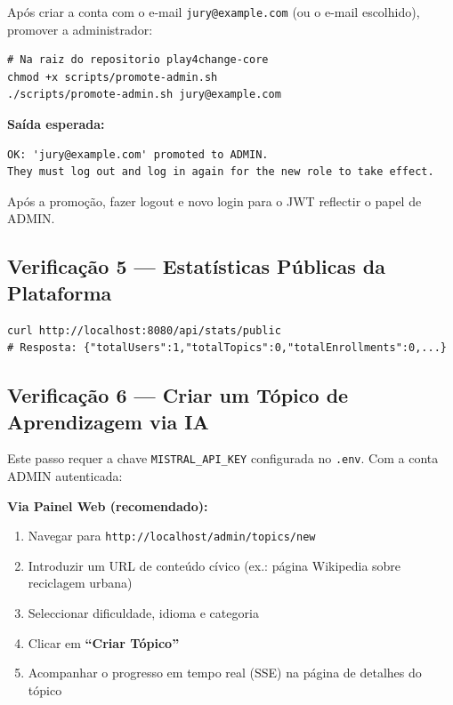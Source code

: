 \documentclass[12pt,a4paper]{article}
\newcommand{\file}[1]{\texttt{\small\color{darkgray}#1}}
\newcommand{\env}[1]{\texttt{\small\color{iselred}#1}}
\begin{document}
Após criar a conta com o e-mail \texttt{jury@example.com} (ou o e-mail escolhido), promover a administrador:

\begin{lstlisting}[style=bash]
# Na raiz do repositorio play4change-core
chmod +x scripts/promote-admin.sh
./scripts/promote-admin.sh jury@example.com
\end{lstlisting}

\textbf{Saída esperada:}
\begin{lstlisting}
OK: 'jury@example.com' promoted to ADMIN.
They must log out and log in again for the new role to take effect.
\end{lstlisting}

Após a promoção, fazer logout e novo login para o JWT reflectir o papel de ADMIN.

\subsection{Verificação 5 — Estatísticas Públicas da Plataforma}

\begin{lstlisting}[style=bash]
curl http://localhost:8080/api/stats/public
# Resposta: {"totalUsers":1,"totalTopics":0,"totalEnrollments":0,...}
\end{lstlisting}

\subsection{Verificação 6 — Criar um Tópico de Aprendizagem via IA}

Este passo requer a chave \env{MISTRAL\_API\_KEY} configurada no \file{.env}. Com a conta ADMIN autenticada:

\begin{mdframed}[style=infobox]
\textbf{Via Painel Web (recomendado):}
\begin{enumerate}
  \item Navegar para \texttt{http://localhost/admin/topics/new}
  \item Introduzir um URL de conteúdo cívico (ex.: página Wikipedia sobre reciclagem urbana)
  \item Seleccionar dificuldade, idioma e categoria
  \item Clicar em \textbf{``Criar Tópico''}
  \item Acompanhar o progresso em tempo real (SSE) na página de detalhes do tópico
\end{enumerate}
\end{mdframed}
\end{document}
